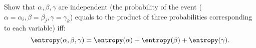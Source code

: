 Show that $\alpha, \beta, \gamma$ are independent (the probability of the event ($\alpha = \alpha_i,
\beta = \beta_j, \gamma = \gamma_k$) equals to the product of three probabilities corresponding to each
variable) iff:
$$
    \entropy(\alpha, \beta, \gamma) = \entropy(\alpha) + \entropy(\beta) + \entropy(\gamma).
$$